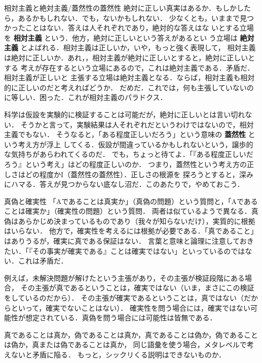         \begin{memo}{相対主義と絶対主義/蓋然性の蓋然性}
            絶対に正しい真実はあるか．もしかしたら，あるかもしれない．でも，ないかもしれない．
            少なくとも，いままで見つかったことはない．答えは人それぞれであり，絶対的な答えはな
            いとする立場を \textbf{相対主義} という．他方，絶対に正しいという答えがあるとい
            う立場は \textbf{絶対主義} とよばれる．相対主義は正しいか，いや，もっと強く表現して，
            相対主義は絶対に正しいか．あれ，，相対主義が絶対に正しいとすると，絶対に正しいとする
            考えが存在するという立場にあるので，これは絶対主義である．矛盾だ．相対主義が正しいと
            主張する立場は絶対主義となる．ならば，相対主義も相対的に正しいのだと考えればどうか．
            だめだ．これでは，何も主張していないのに等しい．困った．これが相対主義のパラドクス．

            科学は仮設を実験的に検証することは可能だが，絶対に正しいとは言い切れない．
            そうかと言って，実験結果は人それぞれだというわけではないので，相対主義でもない．
            そうなると，「ある程度正しいだろう」という意味の \textbf{蓋然性} という考え方が浮上
            してくる．仮設が間違っているかもしれないという，譲歩的な気持ちがあらわれてくるのだ．
            でも，ちょっと待てよ．「『ある程度正しいだろう』という考え」はどの程度正しいのか．
            つまり，蓋然性という考え方の正しさはどの程度かI（蓋然性の蓋然性）．正しさの根源を
            探ろうとすると，深みにハマる．答えが見つからない底なし沼だ．このあたりで，やめておこう．
        \end{memo}

        \begin{memo}{真偽と確実性}
            「Aであることは真実か」（真偽の問題）という質問と，「Aであることは確実か」（確実性の問題）という質問．
            両者は似ているようで異なる．真偽はあらかじめ決まっているものであり（我々が知らないだけ），実質的に根拠はいらない．
            他方で，確実性を考えるには根拠が必要である．「真であること」はありうるが，確実に真である保証はない．
            言葉と意味と論理に注意しておきたい．「『その事実が確実である』ことは確実ではない」といっているのではない．これは矛盾だ．

            例えば，未解決問題が解けたという主張があり，その主張が検証段階にある場合，
            その主張が真であるということは，確実ではない（いま，まさにこの検証をしているのだから）．
            その主張が確実であるということは，真ではない（だからといって，確実でないことはない）．
            確実性を問う場合には，確実ではない可能性が想定されている．真偽を問う場合には可能性は皆無である．

            真であることは真か，偽であることは真か，真であることは偽か，偽であることは偽か，真または偽であることは真か，
            同じ語彙を使う場合，メタレベルで考えないと矛盾に陥る．
            もっと，シックリくる説明はできないものか．
        \end{memo}


